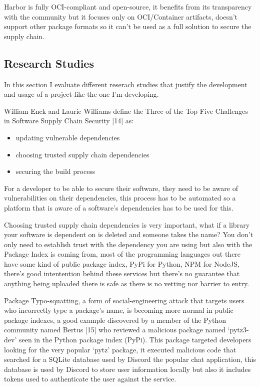 \documentclass{article}
\begin{document}
  Harbor is fully OCI-compliant and open-source, it benefits from its transparency with the community but it focuses only on OCI/Container artifacts, doesn't support other package formats so it can't be used as a full solution to secure the supply chain.

  \subsection{Research Studies}

  In this section I evaluate different reserach studies that justify the development and usage of a project like the one I'm developing.
  
  William Enck and Laurie Williams define the Three of the Top Five Challenges in Software Supply Chain Security [14] as:

  \begin{itemize}
    \item updating vulnerable dependencies
    \item choosing trusted supply chain dependencies
    \item securing the build process
  \end{itemize}

  For a developer to be able to secure their software, they need to be aware of vulnerabilities on their dependencies, this process has to be automated so a platform that is aware of a software's dependencies has to be used for this.

  Choosing trusted supply chain dependencies is very important, what if a library your software is dependent on is deleted and someone takes the name? You don't only need to establish trust with the dependency you are using but also with the Package Index is coming from, most of the programming languages out there have some kind of public package index, PyPi for Python, NPM for NodeJS, there's good intentention behind these services but there's no guarantee that anything being uploaded there is safe as there is no vetting nor barrier to entry.

  Package Typo-squatting, a form of social-engineering attack that targets users who incorrectly type a package's name, is becoming more normal in public package indexes, a good example discovered by a member of the Python community named Bertus [15] who reviewed a malicious package named `pytz3-dev' seen in the Python package index (PyPi). This package targeted developers looking for the very popular `pytz' package, it executed malicious code that searched for a SQLite database used by Discord the popular chat application, this database is used by Discord to store user information locally but also it includes tokens used to authenticate the user against the service.
\end{document}
